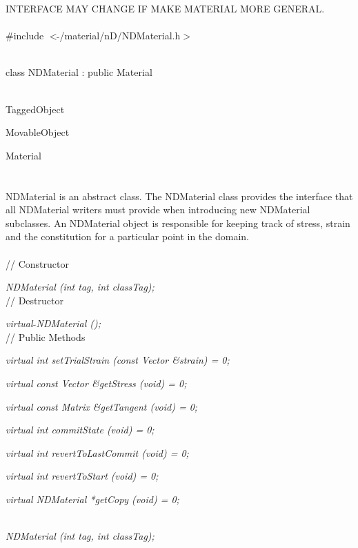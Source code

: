 
INTERFACE MAY CHANGE IF MAKE MATERIAL MORE GENERAL. \\

   \\
\#include $<\tilde{ }$/material/nD/NDMaterial.h$>$  


  \\
class NDMaterial : public Material 


 \\
TaggedObject 

MovableObject 

\indent\indent Material \\
\indent\indent{} \\

  \\
\indent NDMaterial is an abstract class. The
NDMaterial class provides the interface that all
NDMaterial writers must provide when introducing new
NDMaterial subclasses. An NDMaterial object 
is responsible for keeping track of stress, strain and the
constitution for a particular point in the domain. \\ 

 \\
// Constructor 

{\em NDMaterial (int tag, int classTag);}  \\ 

// Destructor 

{\em virtual $\tilde{ }$NDMaterial ();}\\ 

// Public Methods 

{\em virtual int setTrialStrain (const Vector \&strain) = 0; } 

{\em virtual const Vector \&getStress (void) = 0; } 

{\em virtual const Matrix \&getTangent (void) = 0; } 

{\em virtual int commitState (void) = 0; } 

{\em virtual int revertToLastCommit (void) = 0; } 

{\em virtual int revertToStart (void) = 0; } 

{\em virtual NDMaterial *getCopy (void) = 0; } 



  \\
{\em NDMaterial (int tag, int classTag);}  

